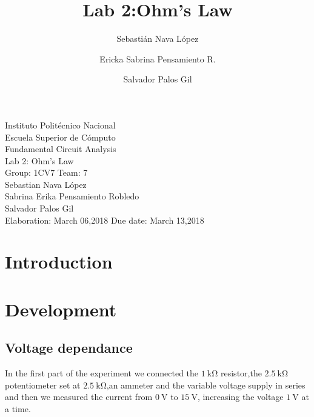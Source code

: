 \documentclass[a4paper]{article}
\title{Lab 2:Ohm's Law}
\author{
    Sebastián Nava López\\
    \and
    Ericka Sabrina Pensamiento R.\\
    \and
    Salvador Palos Gil
}
\begin{document}
\begin{titlepage}
    \centering
    {\Huge Instituto Politécnico Nacional}\\[3ex]
    {\huge Escuela Superior de Cómputo}\\[8ex]
    {\huge Fundamental Circuit Analysis}\\[12ex]
    {\Large Lab 2: Ohm's Law}\\[20ex]
    {\Large Group: 1CV7 Team: 7 \\[8ex]
    Sebastian Nava López\\[4ex]
    Sabrina Erika Pensamiento Robledo\\[4ex]
    Salvador Palos Gil\\[18ex]
    }
    \large{Elaboration: March 06,2018\hspace{8em} Due date: March 13,2018}
\end{titlepage}
\tableofcontents
\newpage
\section{Introduction}
\newpage
\section{Development}
\subsection{Voltage dependance}
In the first part of the experiment we connected the $\SI{1}{\kilo\ohm}$ resistor,the
$\SI{2.5}{\kilo\ohm}$ potentiometer set at $\SI{2.5}{\kilo\ohm}$,an ammeter and the variable voltage supply in series
and then we measured the current from $\SI{0}{\volt}$ to $\SI{15}{\volt}$, increasing the
voltage $\SI{1}{\volt}$ at a time.
\end{document}
